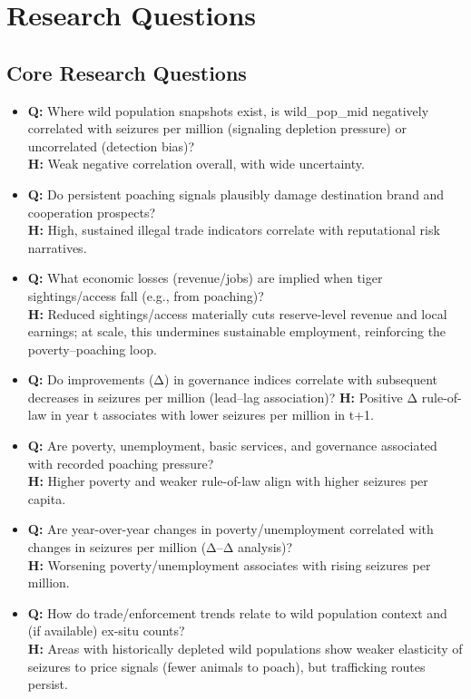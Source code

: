 \documentclass[
]{article}
\begin{document}
\section{Research Questions}\label{research-questions}

\subsection{Core Research Questions}\label{core-research-questions}

\begin{itemize}
\item
  \textbf{Q:} Where wild population snapshots exist, is wild\_pop\_mid
  negatively correlated with seizures per million (signaling depletion
  pressure) or uncorrelated (detection bias)?\\
  \textbf{H:} Weak negative correlation overall, with wide uncertainty.
\item
  \textbf{Q:} Do persistent poaching signals plausibly damage
  destination brand and cooperation prospects?\\
  \textbf{H:} High, sustained illegal trade indicators correlate with
  reputational risk narratives.
\item
  \textbf{Q:} What economic losses (revenue/jobs) are implied when tiger
  sightings/access fall (e.g., from poaching)?\\
  \textbf{H:} Reduced sightings/access materially cuts reserve-level
  revenue and local earnings; at scale, this undermines sustainable
  employment, reinforcing the poverty--poaching loop.
\item
  \textbf{Q:} Do improvements (Δ) in governance indices correlate with
  subsequent decreases in seizures per million (lead--lag association)?
  \textbf{H:} Positive Δ rule-of-law in year t associates with lower
  seizures per million in t+1.
\item
  \textbf{Q:} Are poverty, unemployment, basic services, and governance
  associated with recorded poaching pressure?\\
  \textbf{H:} Higher poverty and weaker rule-of-law align with higher
  seizures per capita.
\item
  \textbf{Q:} Are year-over-year changes in poverty/unemployment
  correlated with changes in seizures per million (Δ--Δ analysis)?\\
  \textbf{H:} Worsening poverty/unemployment associates with rising
  seizures per million.
\item
  \textbf{Q:} How do trade/enforcement trends relate to wild population
  context and (if available) ex-situ counts?\\
  \textbf{H:} Areas with historically depleted wild populations show
  weaker elasticity of seizures to price signals (fewer animals to
  poach), but trafficking routes persist.
\end{itemize}
\end{document}
